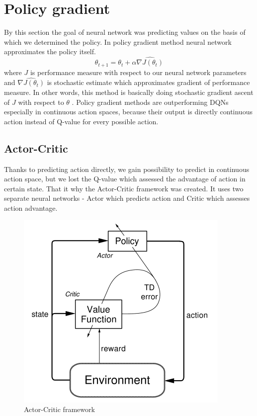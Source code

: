 \section{Policy gradient}
By this section the goal of neural network was predicting values on the basis of which we determined the policy. In policy gradient method neural network approximates the policy itself. 
\begin{equation}
\theta_{t+1} = \theta_t + \alpha \widehat{\nabla J(\theta_t)}
\end{equation}
where $J$ is performance measure with respect to our neural network parameters and $\widehat{\nabla J(\theta_t)}$ is stochastic estimate which approximates gradient of performance measure. In other words, this method is basically doing stochastic gradient ascent of $J$ with respect to $\theta$ \cite{sutton1999}. Policy gradient methods are outperforming DQNs especially in continuous action spaces, because their output is directly continuous action instead of Q-value for every possible action.

\subsection{Actor-Critic}
Thanks to predicting action directly, we gain possibility to predict in continuous action space, but we lost the Q-value which assessed the advantage of action in certain state. That it why the Actor-Critic framework was created. It uses two separate neural networks - Actor which predicts action and Critic which assesses action advantage.
\begin{figure}[!h]
\centering
\includegraphics[scale=0.55]{fig/actor-critic.png}
\caption{Actor-Critic framework}
\end{figure}
\clearpage

